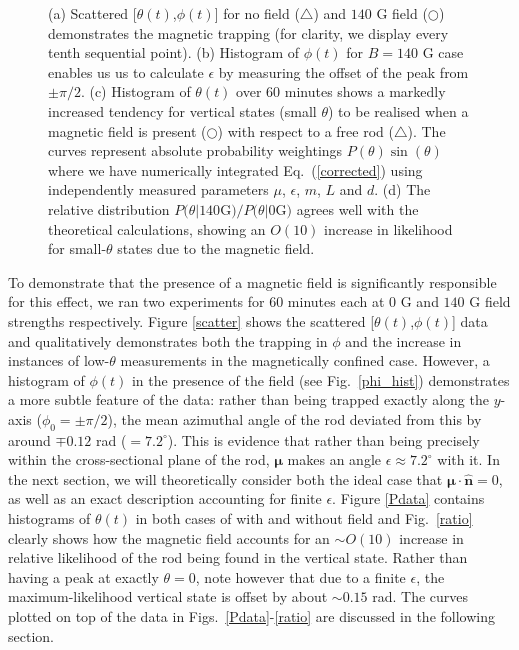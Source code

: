 \documentclass[aps,prl,twocolumn,superscriptaddress]{revtex4-1}
\newcommand{\hvcrm}[1]{\mathbf{\hat{#1}}}
\newcommand{\vc}[1]{\boldsymbol{#1}}
\begin{document}
\begin{figure}
    \caption{\footnotesize (a) Scattered [$\theta(t)$,$\phi(t)$] for no field ($\bigtriangleup$) and $140$ G field ($\bigcirc$) demonstrates the magnetic trapping (for clarity, we display every tenth sequential point). (b) Histogram of $\phi(t)$ for $B=140$ G case enables us us to calculate $\epsilon$ by measuring the offset of the peak from $\pm \pi/2$. (c) Histogram of $\theta(t)$ over 60 minutes shows a markedly increased tendency for vertical states (small $\theta$) to be realised when a magnetic field is present ($\bigcirc$) with respect to a free rod ($\bigtriangleup$). The curves represent absolute probability weightings $P(\theta) \sin(\theta)$ where we have numerically integrated Eq.\ (\ref{corrected}) using independently measured parameters $\mu$, $\epsilon$, $m$, $L$ and $d$. (d) The relative distribution $P(\theta | 140 $G$)/P(\theta | 0 $G$)$ agrees well with the theoretical calculations, showing an $O(10)$ increase in likelihood for small-$\theta$ states due to the magnetic field.}
\end{figure}



To demonstrate that the presence of a magnetic field is significantly responsible for this effect, we ran two experiments for 60 minutes each at $0$ G and $140$ G field strengths respectively. Figure \ref{scatter} shows the scattered [$\theta(t)$,$\phi(t)$] data and qualitatively demonstrates both the trapping in $\phi$ and the increase in instances of low-$\theta$ measurements in the magnetically confined case. However, a histogram of $\phi(t)$ in the presence of the field (see Fig.\ \ref{phi_hist}) demonstrates a more subtle feature of the data: rather than being trapped exactly along the $y$-axis ($\phi_0=\pm\pi/2$), the mean azimuthal angle of the rod deviated from this by around $\mp0.12$ rad ($= 7.2^\circ$). This is evidence that rather than being precisely within the cross-sectional plane of the rod, $\vc{\mu}$ makes an angle $\epsilon\approx 7.2^\circ$ with it. In the next section, we will theoretically consider both the ideal case that $\vc{\mu}\cdot\hvcrm{n}=0$, as well as an exact description accounting for finite $\epsilon$. Figure \ref{Pdata} contains histograms of $\theta(t)$ in both cases of with and without field and Fig.\ \ref{ratio} clearly shows how the magnetic field accounts for an $\sim O(10)$ increase in relative likelihood of the rod being found in the vertical state. Rather than having a peak at exactly $\theta=0$, note however that due to a finite $\epsilon$, the maximum-likelihood vertical state is offset by about $\sim 0.15$ rad. The curves plotted on top of the data in Figs.\ \ref{Pdata}-\ref{ratio} are discussed in the following section.
\end{document}

